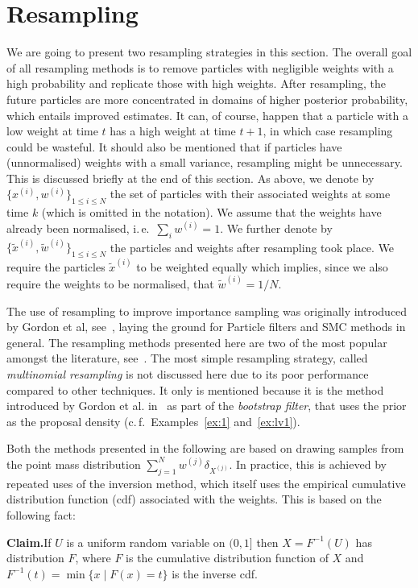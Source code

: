 \section*{Resampling}
We are going to present two resampling strategies in this section. The
overall goal of all resampling methods is to remove particles with
negligible weights with a high probability and replicate those with
high weights. After resampling, the future particles are more
concentrated in domains of higher posterior probability, which entails
improved estimates. It can, of course, happen that a particle with a
low weight at time $t$ has a high weight at time $t+1$, in which case
resampling could be wasteful. It should also be mentioned that if
particles have (unnormalised) weights with a small variance,
resampling might be unnecessary. This is discussed briefly at the end
of this section. As above, we denote by
$\{ x^{(i)}, w^{(i)} \}_{1 \le i \le N}$ the set of particles with
their associated weights at some time $k$ (which is omitted in the
notation). We assume that the weights have already been normalised,
i.\,e.\ $\sum_i w^{(i)} = 1$. We further denote by
$\{ \tilde{x}^{(i)}, \tilde{w}^{(i)} \}_{1 \le i \le N}$ the particles
and weights after resampling took place. We require the particles
$\tilde{x}^{(i)}$ to be weighted equally which implies, since we also
require the weights to be normalised, that $\tilde{w}^{(i)} = 1/N$.

The use of resampling to improve importance sampling was originally
introduced by Gordon et al, see~\cite{gordon}, laying the ground for
Particle filters and SMC methods in general. The resampling methods
presented here are two of the most popular amongst the literature,
see~\cite{douc}.  The most simple resampling strategy, called
\emph{multinomial resampling} is not discussed here due to its poor
performance compared to other techniques. It only is mentioned because
it is the method introduced by Gordon et al. in~\cite{gordon} as part
of the\emph{ bootstrap filter}, that uses the prior as the proposal
density (c.\,f.\ Examples~\ref{ex:1} and~\ref{ex:lv1}).

Both the methods presented in the following are based on drawing
samples from the point mass distribution
$\sum_{j=1}^N w^{(j)} \delta_{X^{(j)}}$. In practice, this is achieved
by repeated uses of the inversion method, which itself uses the
empirical cumulative distribution function (cdf) associated with the
weights. This is based on the following fact:

\textbf{Claim.}\quad If $U$ is a uniform random variable on $(0,1]$
then $X = F^{-1}(U)$ has distribution $F$, where $F$ is the cumulative
distribution function of $X$ and
$F^{-1}(t) = \min \{ x \mid F(x) = t \}$ is the inverse cdf.

